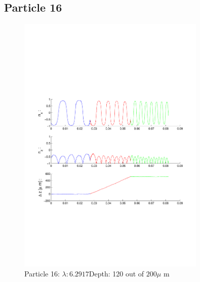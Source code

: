 \subsection{Particle 16}
\begin{figure}[H]
\centering
\includegraphics[width=0.8\textwidth]{Images/Particle 16/Particle16.pdf}
\caption{Particle 16: $ \lambda: 6.2917$Depth: 120 out of $200 \mu $ m}
\end{figure}

